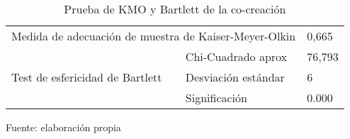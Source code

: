 \begin{table}[h]
    \caption {Prueba de KMO y Bartlett de la co-creación}
	\label{tab:kmo2}
	\setlength\extrarowheight{5pt}
	
	\begin{tabular}{p{5.7cm} p{4.6cm} p{2.8cm}}
	\toprule
	\multicolumn{2}{c}{Medida de adecuación de muestra de Kaiser-Meyer-Olkin}	& 0,665 \\
									& Chi-Cuadrado aprox	& 76,793 \\
	Test de esfericidad de Bartlett	& Desviación estándar					& 6 \\
									& Significación					& 0.000 \\
	\bottomrule
	\end{tabular}
	
	\center
	\footnotesize
	Fuente: elaboración propia
\end{table}

